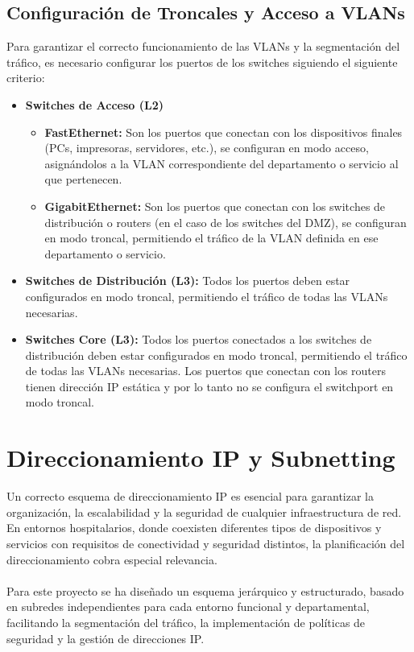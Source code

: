 \subsection{Configuración de Troncales y Acceso a VLANs}
Para garantizar el correcto funcionamiento de las VLANs y la segmentación del tráfico, es necesario configurar los puertos de los switches siguiendo el siguiente criterio:
\begin{itemize}
    \item \textbf{Switches de Acceso (L2)} 
    \begin{itemize}
        \item \textbf{FastEthernet:} Son los puertos que conectan con los dispositivos finales (PCs, impresoras, servidores, etc.), se configuran en modo acceso, asignándolos a la VLAN correspondiente 
        del departamento o servicio al que pertenecen.
        \item \textbf{GigabitEthernet:} Son los puertos que conectan con los switches de distribución o routers (en el caso de los switches del DMZ), se configuran en modo troncal, permitiendo el tráfico de la VLAN definida en ese departamento o servicio.
    \end{itemize}
    \item \textbf{Switches de Distribución (L3):} Todos los puertos deben estar configurados en modo troncal, permitiendo el tráfico de todas las VLANs necesarias.
    \item \textbf{Switches Core (L3):} Todos los puertos conectados a los switches de distribución deben estar configurados en modo troncal, permitiendo el tráfico de todas las VLANs necesarias. Los puertos que conectan con los routers 
    tienen dirección IP estática y por lo tanto no se configura el switchport en modo troncal.
\end{itemize}

\section{Direccionamiento IP y Subnetting}\label{sec:direccionamiento}
Un correcto esquema de direccionamiento IP es esencial para garantizar la organización, la escalabilidad y la seguridad de cualquier infraestructura de red. En entornos 
hospitalarios, donde coexisten diferentes tipos de dispositivos y servicios con requisitos de conectividad y seguridad distintos, la planificación del direccionamiento 
cobra especial relevancia.
\\ \\
Para este proyecto se ha diseñado un esquema jerárquico y estructurado, basado en subredes independientes para cada entorno funcional y departamental, facilitando la 
segmentación del tráfico, la implementación de políticas de seguridad y la gestión de direcciones IP.

